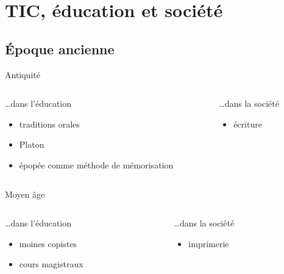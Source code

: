 
\section{TIC, éducation et société}

\subsection{Époque ancienne}

\begin{frame}{Antiquité}
\begin{columns}
\begin{column}{0.49\linewidth}
\ldots dans l'éducation
\begin{itemize}
\item traditions orales
\item Platon
\item épopée comme méthode de mémorisation
\end{itemize}
\end{column}

\begin{column}{0.49\linewidth}
\ldots dans la société
\begin{itemize}
\item écriture
\end{itemize}
\end{column}
\end{columns}
\end{frame}

\begin{frame}{Moyen âge}
\begin{columns}
\begin{column}{0.49\linewidth}
\ldots dans l'éducation
\begin{itemize}
\item moines copistes
\item cours magistraux
\end{itemize}
\end{column}

\begin{column}{0.49\linewidth}
\ldots dans la société
\begin{itemize}
\item imprimerie
\end{itemize}
\end{column}
\end{columns}
\end{frame}


